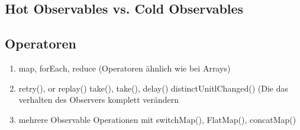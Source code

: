 \subsection{Hot Observables vs. Cold Observables}
\subsection{Operatoren}
\begin{enumerate} 
\item map, forEach, reduce (Operatoren ähnlich wie bei Arrays)
\item retry(), or replay() take(), take(), delay() distinctUnitlChanged() (Die das verhalten des Observers komplett verändern
\item mehrere Observable Operationen mit switchMap(), FlatMap(), concatMap()
\end{enumerate}
